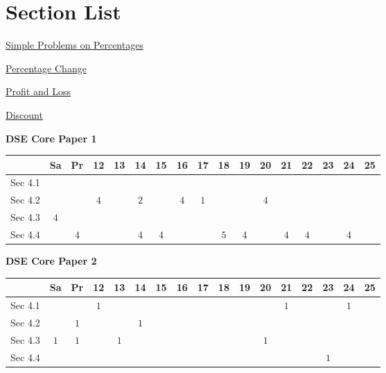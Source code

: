 \documentclass[12pt, a4paper]{article}
\begin{document}
\section*{Section List}
\begin{enumx}[label=Sec 4.\arabic*\ ]
\item \hyperref[section:1-4-1]{Simple Problems on Percentages}
\item \hyperref[section:1-4-2]{Percentage Change}
\item \hyperref[section:1-4-3]{Profit and Loss}
\item \hyperref[section:1-4-4]{Discount}
\end{enumx}
\begin{absolutelynopagebreak}
\begin{center}
\textbf{DSE Core Paper 1}
\end{center}
\begin{center}
\begin{tabular}{|l|c|c|c|c|c|c|c|c|c|c|c|c|c|c|c|c|}
\hline
        & Sa & Pr & 12 & 13 & 14 & 15 & 16 & 17 & 18 & 19 & 20 & 21 & 22 & 23 & 24 & 25 \\\hline\hline
Sec 4.1 &  &  &  &  &  &  &  &  &  &  &  &  &  &  &  &  \\\hline
Sec 4.2 &  &  &  $4$ &  &  $2$ &  &  $4$ &  $1$ &  &  &  $4$ &  &  &  &  &  \\\hline
Sec 4.3 &  $4$ &  &  &  &  &  &  &  &  &  &  &  &  &  &  &  \\\hline
Sec 4.4 &  &  $4$ &  &  &  $4$ &  $4$ &  &  &  $5$ &  $4$ &  &  $4$ &  $4$ &  &  $4$ &  \\\hline
\end{tabular}
\end{center}
\end{absolutelynopagebreak}
\begin{absolutelynopagebreak}
\begin{center}
\textbf{DSE Core Paper 2}
\end{center}
\begin{center}
\begin{tabular}{|l|c|c|c|c|c|c|c|c|c|c|c|c|c|c|c|c|}
\hline
        & Sa & Pr & 12 & 13 & 14 & 15 & 16 & 17 & 18 & 19 & 20 & 21 & 22 & 23 & 24 & 25 \\\hline\hline
Sec 4.1 &  &  &  $1$ &  &  &  &  &  &  &  &  &  $1$ &  &  &  $1$ &  \\\hline
Sec 4.2 &  &  $1$ &  &  &  $1$ &  &  &  &  &  &  &  &  &  &  &  \\\hline
Sec 4.3 &  $1$ &  $1$ &  &  $1$ &  &  &  &  &  &  &  $1$ &  &  &  &  &  \\\hline
Sec 4.4 &  &  &  &  &  &  &  &  &  &  &  &  &  &  $1$ &  &  \\\hline
\end{tabular}
\end{center}
\end{absolutelynopagebreak}
\end{document}
